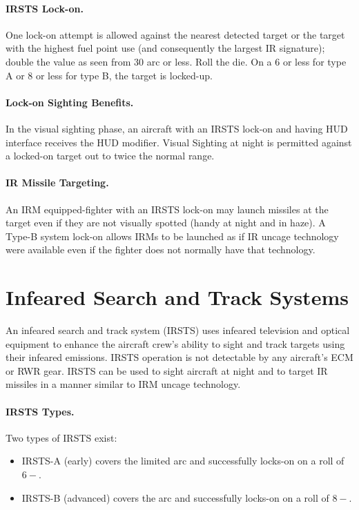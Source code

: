 \begin{advancedrules}
{\paragraph{IRSTS Lock-on.} One lock-on attempt is allowed against the nearest detected target or the target with the highest fuel point use (and consequently the largest IR signature); double the value as seen from 30{\deg} arc or less. Roll the die. On a 6 or less for type A or 8 or less for type B, the target is locked-up.

\paragraph{Lock-on Sighting Benefits.} In the visual sighting phase, an aircraft with an IRSTS lock-on and having HUD interface receives the HUD modifier. Visual Sighting at night is permitted against a locked-on target out to twice the normal range.

\paragraph{IR Missile Targeting.} An IRM equipped-fighter with an IRSTS lock-on may launch missiles at the target even if they are not visually spotted (handy at night and in haze).  A Type-B system lock-on allows IRMs to be launched as if IR uncage technology were available even if the fighter does not normally have that technology.
}{

\section{Infeared Search and Track Systems}
\label{rule:irsts}

An infeared search and track system (IRSTS) uses infeared television and optical equipment to enhance the aircraft crew’s ability to sight and track targets using their infeared emissions. IRSTS operation is not detectable by any aircraft’s ECM or RWR gear. IRSTS can be used to sight aircraft at night and to target IR missiles in a manner similar to IRM uncage technology.

\paragraph{IRSTS Types.} Two types of IRSTS exist: 
\begin{itemize}
    \item IRSTS-A (early) covers the limited arc and successfully locks-on on a roll of $6-$.
    \item IRSTS-B (advanced) covers the  arc and successfully locks-on on a roll of $8-$.
\end{itemize}

}
\end{advancedrules}
